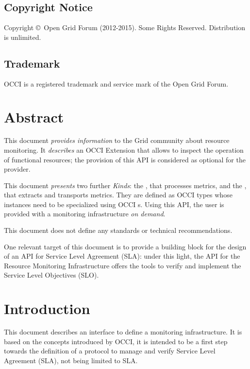 \documentclass[12pt]{article}  %
\newcommand{\copyrightyears}{2012-2015}  %
\begin{document}
\subsection*{Copyright Notice}

Copyright \copyright \ Open Grid Forum (\copyrightyears).  Some Rights Reserved.  
Distribution is unlimited.

\subsection*{Trademark}

OCCI is a registered trademark and service mark of the Open Grid Forum. 

\section*{Abstract}

This document {\em provides information} to the Grid community about resource monitoring. It {\em describes} an OCCI Extension that allows to inspect the operation of functional resources; the provision of this API is considered as optional for the provider.

This document {\em presents} two further {\em Kinds}: the \sens, that processes metrics, and the \coll, that extracts and transports metrics. They are defined as OCCI types whose instances need to be specialized using OCCI \mi s. Using this API, the user is provided with a monitoring infrastructure {\em on demand}.

This document does not define any standards or technical recommendations.

One relevant target of this document is to provide a building block for the design of an API for Service Level Agreement (SLA): under this light, the API for the Resource Monitoring Infrastructure offers the tools to verify and implement the Service Level Objectives (SLO).

\tableofcontents

\newpage

\section{Introduction}

This document describes an interface to define a monitoring infrastructure. It is based on the concepts introduced by OCCI, it is intended to be a first step towards the definition of a protocol to manage and verify Service Level Agreement (SLA), not being limited to SLA.
\end{document}
